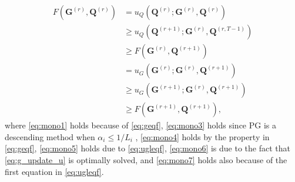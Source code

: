 \documentclass[10pt,journal]{IEEEtran}
\newcommand{\Q}{\boldsymbol{Q}}
\begin{document}
\begin{subequations}\label{eq:mono}
\begin{align}
         F\left({\bm G}^{(r)},{\bm Q}^{(r)}\right) & = u_Q(\Q^{(r)};{\bm G}^{(r)},{\bm Q}^{(r)}) \label{eq:mono1}\\
                                                   & \geq u_Q(\Q^{(r+1)};{\bm G}^{(r)},{\bm Q}^{(r,T-1)}) \label{eq:mono3}\\
                                                   &\geq F\left({\bm G}^{(r)},{\bm Q}^{(r+1)}\right) \label{eq:mono4}\\
                                                   &= u_G\left({\bm G}^{(r)};{\bm G}^{(r)},{\bm Q}^{(r+1)}\right) \label{eq:mono5}\\
												   &\geq u_G\left({\bm G}^{(r+1)};{\bm G}^{(r)},{\bm Q}^{(r+1)}\right) \label{eq:mono6}\\
												   &\geq F\left({\bm G}^{(r+1)},{\bm Q}^{(r+1)}\right), \label{eq:mono7}
\end{align}
\end{subequations}
where \eqref{eq:mono1} holds because of \eqref{eq:geqf}, \eqref{eq:mono3} holds
since PG is a descending method when $\alpha_i\leq 1/L_i$ \cite{beck2009fast},
\eqref{eq:mono4} holds by the property in \eqref{eq:geqf},
\eqref{eq:mono5} holds due to \eqref{eq:ugleqf},
\eqref{eq:mono6} is due to the fact that \eqref{eq:g_update_u} is optimally solved,
and \eqref{eq:mono7} holds also because of the first equation in \eqref{eq:ugleqf}.
\end{document}
